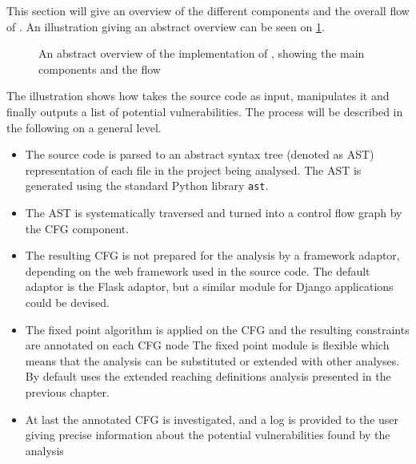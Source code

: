 \label{impl:overview}
This section will give an overview of the different components and the overall flow of \pyt{}.
An illustration giving an abstract overview can be seen on \cref{figure:implementation_overview}.

\begin{figure}
  
  \caption{An abstract overview of the implementation of \pyt{}, showing the main components and the flow}
  \label{figure:implementation_overview}
\end{figure}

The illustration shows how  \pyt{} takes the source code as input, manipulates it and finally outputs a list of potential vulnerabilities.
The process will be described in the following on a general level.

\begin{itemize}
\item The source code is parsed to an abstract syntax tree (denoted as AST) representation of each file in the project being analysed.
The AST is generated using the standard Python library \texttt{ast}\cite{python_ast}.
\item The AST is systematically traversed and turned into a control flow graph by the CFG component.
\item The resulting CFG is not prepared for the analysis by a framework adaptor, depending on the web framework used in the source code.
  The default adaptor is the Flask adaptor, but a similar module for Django applications could be devised.
\item The fixed point algorithm is applied on the CFG and the resulting constraints are annotated on each CFG node
  The fixed point module is flexible which means that the analysis can be substituted or extended with other analyses.
  By default \pyt{} uses the extended reaching definitions analysis presented in the previous chapter.
\item At last the annotated CFG is investigated, and a log is provided to the user giving precise information about the potential vulnerabilities found by the analysis
\end{itemize}
